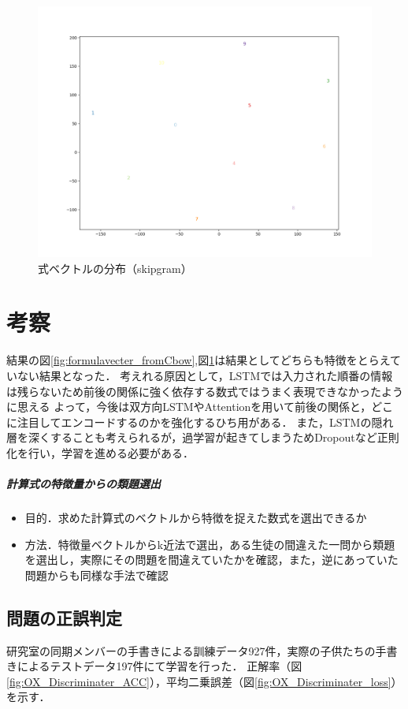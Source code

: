 \documentclass[a4j,11pt,report]{jsbook}
\begin{document}
\begin{center}
  \begin{figure}
    \centering
    \includegraphics[width=0.8\linewidth]{image/skip89x2.png}
    \caption{式ベクトルの分布（skipgram）}
    \label{fig:formulavecter_fromSkip}
  \end{figure}
\end{center}

\section{考察}
結果の図\ref{fig:formulavecter_fromCbow},図\ref{fig:formulavecter_fromSkip}は結果としてどちらも特徴をとらえていない結果となった．
考えれる原因として，LSTMでは入力された順番の情報は残らないため前後の関係に強く依存する数式ではうまく表現できなかったように思える
よって，今後は双方向LSTMやAttentionを用いて前後の関係と，どこに注目してエンコードするのかを強化するひち用がある．
また，LSTMの隠れ層を深くすることも考えられるが，過学習が起きてしまうためDropoutなど正則化を行い，学習を進める必要がある．


\subparagraph{計算式の特徴量からの類題選出}
\begin{itemize}ß
  \item 目的．求めた計算式のベクトルから特徴を捉えた数式を選出できるか
  \item 方法．特徴量ベクトルからk近法で選出，ある生徒の間違えた一問から類題を選出し，実際にその問題を間違えていたかを確認，また，逆にあっていた問題からも同様な手法で確認

\end{itemize}
\fi
\subsection{問題の正誤判定}
研究室の同期メンバーの手書きによる訓練データ927件，実際の子供たちの手書きによるテストデータ197件にて学習を行った．
正解率（図\ref{fig:OX_Discriminater_ACC}），平均二乗誤差（図\ref{fig:OX_Discriminater_loss}）を示す．
\end{document}

